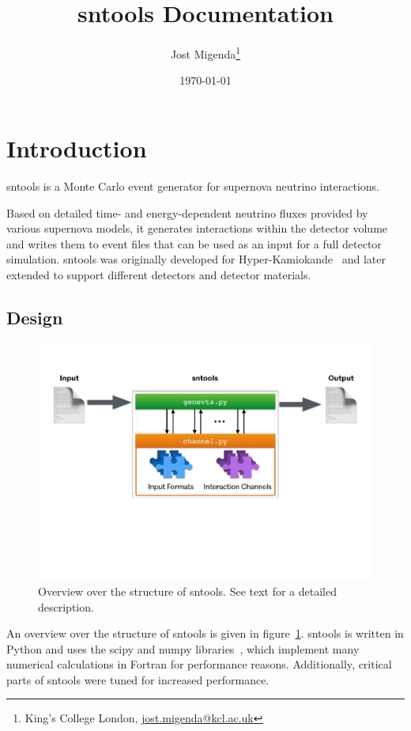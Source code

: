 \documentclass[11pt, oneside]{article}
\title{sntools Documentation}
\author{Jost Migenda\footnote{King’s College London, \url{jost.migenda@kcl.ac.uk}}}
\date{\today}
\begin{document}
\maketitle
\setcounter{tocdepth}{2}
\tableofcontents
\clearpage


\section{Introduction}

sntools is a Monte Carlo event generator for supernova neutrino interactions.

Based on detailed time- and energy-dependent neutrino fluxes provided by various supernova models, it generates interactions within the detector volume and writes them to event files that can be used as an input for a full detector simulation.
sntools was originally developed for Hyper-Kamiokande~\cite{Migenda2019} and later extended to support different detectors and detector materials.


\subsection{Design}
\begin{figure}[htbp]
	\centering
	\includegraphics[scale=0.52]{sntools-overview.pdf}
	\caption[Overview over the structure of sntools]{Overview over the structure of sntools. See text for a detailed description.}
	\label{fig-sim-sntools-overview}
\end{figure}

An overview over the structure of sntools is given in figure~\ref{fig-sim-sntools-overview}.
sntools is written in Python and uses the scipy and numpy libraries~\cite{Virtanen2020,Walt2011}, which implement many numerical calculations in Fortran for performance reasons.
Additionally, critical parts of sntools were tuned for increased performance.
\end{document}
